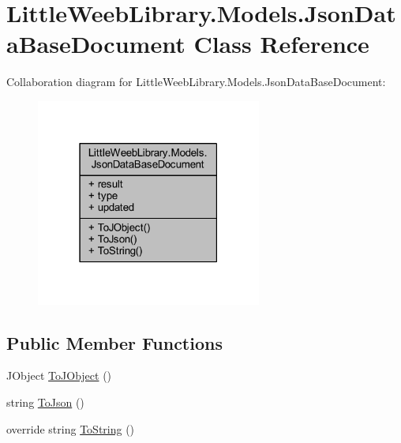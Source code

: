 \hypertarget{class_little_weeb_library_1_1_models_1_1_json_data_base_document}{}\section{Little\+Weeb\+Library.\+Models.\+Json\+Data\+Base\+Document Class Reference}
\label{class_little_weeb_library_1_1_models_1_1_json_data_base_document}


Collaboration diagram for Little\+Weeb\+Library.\+Models.\+Json\+Data\+Base\+Document\+:\nopagebreak
\begin{figure}[H]
\begin{center}
\leavevmode
\includegraphics[width=210pt]{class_little_weeb_library_1_1_models_1_1_json_data_base_document__coll__graph}
\end{center}
\end{figure}
\subsection*{Public Member Functions}
\begin{DoxyCompactItemize}
\item 
J\+Object \mbox{\hyperlink{class_little_weeb_library_1_1_models_1_1_json_data_base_document_ae582e7c7033e71722913fe3b620ac80c}{To\+J\+Object}} ()
\item 
string \mbox{\hyperlink{class_little_weeb_library_1_1_models_1_1_json_data_base_document_a9b07f0f62d6352441b62b26dff058acb}{To\+Json}} ()
\item 
override string \mbox{\hyperlink{class_little_weeb_library_1_1_models_1_1_json_data_base_document_a0a84a997c39ac76d99382cdabf9227bf}{To\+String}} ()
\end{DoxyCompactItemize}
